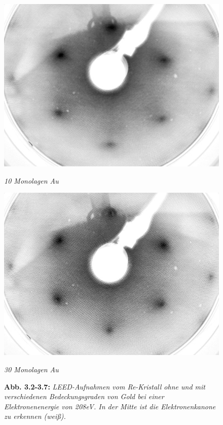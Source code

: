 \begin{figure}[H]
	\begin{minipage}[b]{0.5\textwidth} 
		\includegraphics[width=\textwidth]{LEED-Bilder/bearbeitet/10ML_E207}
		\caption{\textit{10 Monolagen Au}}
		\label{10ML} 
	\end{minipage}
	\hfill
	\begin{minipage}[b]{0.5\textwidth}
		\includegraphics[width=\textwidth]{LEED-Bilder/bearbeitet/30ML_E208}
		\caption{\textit{30 Monolagen Au}}
		\label{30ML} 
	\end{minipage}
	\caption*{\textbf{Abb. 3.2-3.7:} \textit{LEED-Aufnahmen vom Re-Kristall ohne und mit
	verschiedenen Bedeckungsgraden von Gold bei einer Elektronenenergie von 208eV. In
	der Mitte ist die Elektronenkanone zu erkennen (weiß).}}
\end{figure}


